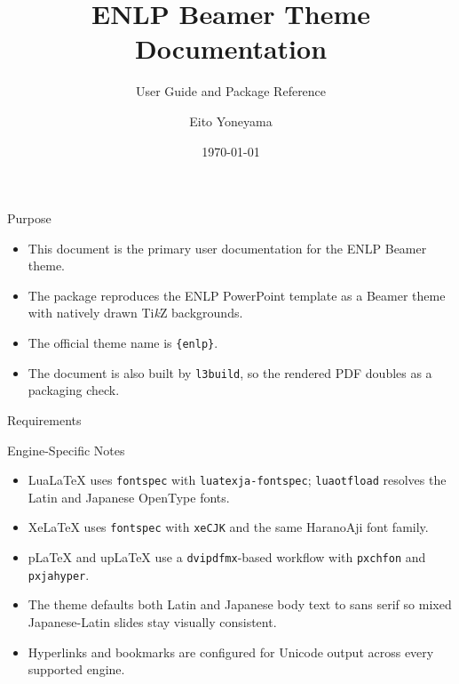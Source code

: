 \documentclass[10pt]{beamer}
\title{ENLP Beamer Theme Documentation}
\subtitle{User Guide and Package Reference}
\author{Eito Yoneyama}
\institute{Ehime University Natural Language Processing Laboratory}
\date{\today}
\begin{document}
\enlptitleframe


\begin{frame}{Purpose}
  \begin{itemize}
    \item This document is the primary user documentation for the ENLP Beamer theme.
    \item The package reproduces the ENLP PowerPoint template as a Beamer theme with natively drawn Ti\textit{k}Z backgrounds.
    \item The official theme name is \texttt{\string\usetheme\{enlp\}}.
    \item The document is also built by \texttt{l3build}, so the rendered PDF doubles as a packaging check.
  \end{itemize}
\end{frame}

\begin{frame}{Requirements}
\end{frame}

\begin{frame}{Engine-Specific Notes}
  \begin{itemize}
    \item LuaLaTeX uses \texttt{fontspec} with \texttt{luatexja-fontspec}; \texttt{luaotfload} resolves the Latin and Japanese OpenType fonts.
    \item XeLaTeX uses \texttt{fontspec} with \texttt{xeCJK} and the same HaranoAji font family.
    \item pLaTeX and upLaTeX use a \texttt{dvipdfmx}-based workflow with \texttt{pxchfon} and \texttt{pxjahyper}.
    \item The theme defaults both Latin and Japanese body text to sans serif so mixed Japanese-Latin slides stay visually consistent.
    \item Hyperlinks and bookmarks are configured for Unicode output across every supported engine.
  \end{itemize}
\end{frame}
\end{document}
